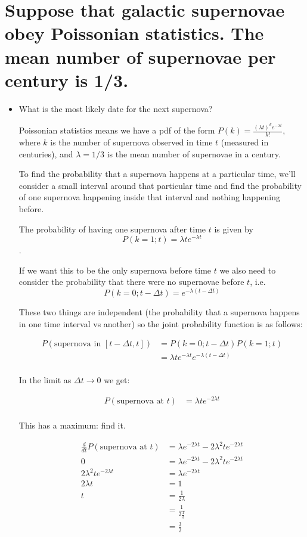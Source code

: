 \section{Suppose that galactic supernovae obey Poissonian statistics.
The mean number of supernovae per century is 1/3.}

\begin{itemize}
    \item What is the most likely date for the next supernova?

    Poissonian statistics means we have a pdf of the form
    $P(k) = \frac{(\lambda t)^k e^{-\lambda t}}{k!}$,
    where $k$ is the number of supernova observed in time $t$ (measured in centuries),
    and $\lambda = 1/3$ is the mean number of supernovae in a century.

    To find the probability that a supernova happens at a particular time, we'll consider a small interval around that particular time and find the probability of one supernova happening inside that interval and nothing happening before.

    The probability of having one supernova after time $t$ is given by 
    $$P(k=1;t) = \lambda t e^{-\lambda t}$$.

    If we want this to be the only supernova before time $t$ we also need to consider the probability that there were no supernovae before $t$, i.e.
    $$P(k=0;t-\Delta t) = e^{-\lambda (t-\Delta t)}$$

    These two things are independent (the probability that a supernova happens in one time interval vs another) so the joint probability function is as follows:

    \begin{align*}
        P(\text{supernova in }[t-\Delta t, t]) &= P(k=0;t-\Delta t)P(k=1;t) \\
        &=  \lambda t e^{-\lambda t}e^{-\lambda (t - \Delta t)} \\
    \end{align*}

    In the limit as $\Delta t \to 0$ we get:

    \begin{align*}
        P(\text{supernova at }t) &=  \lambda t e^{-2\lambda t} \\
    \end{align*}

    This has a maximum: find it.

    \begin{align*}
        \frac{d}{dt}P(\text{supernova at }t) &=  \lambda e^{-2\lambda t} - 2\lambda^2 t e^{-2\lambda t} \\
        0 &=  \lambda e^{-2\lambda t} - 2\lambda^2 t e^{-2\lambda t} \\
        2\lambda^2 t e^{-2\lambda t} &=  \lambda e^{-2\lambda t} \\
        2\lambda t &= 1\\
        t &= \frac{1}{2\lambda}\\
        &= \frac{1}{2\frac{1}{3}}\\
        &= \frac{3}{2}\\
    \end{align*}


\end{itemize}

